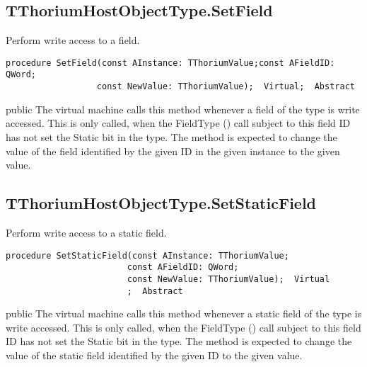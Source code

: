 \subsection{TThoriumHostObjectType.SetField}
\label{thoriumcorepkg:thorium:tthoriumhostobjecttype:setfield}
\begin{FPCList}
\Synopsis
Perform write access to a field.\Declaration 

\begin{verbatim}
procedure SetField(const AInstance: TThoriumValue;const AFieldID: QWord;
                  const NewValue: TThoriumValue);  Virtual;  Abstract
\end{verbatim}
\Visibility
public
\Description
The virtual machine calls this method whenever a field of the type is write accessed. This is only called, when the FieldType (\pageref{thoriumcorepkg:thorium:tthoriumhostobjecttype:fieldtype}) call subject to this field ID has not set the Static bit in the type. The method is expected to change the value of the field identified by the given ID in the given instance to the given value.\end{FPCList}
\subsection{TThoriumHostObjectType.SetStaticField}
\label{thoriumcorepkg:thorium:tthoriumhostobjecttype:setstaticfield}
\begin{FPCList}
\Synopsis
Perform write access to a static field.\Declaration 

\begin{verbatim}
procedure SetStaticField(const AInstance: TThoriumValue;
                        const AFieldID: QWord;
                        const NewValue: TThoriumValue);  Virtual
                        ;  Abstract
\end{verbatim}
\Visibility
public
\Description
The virtual machine calls this method whenever a static field of the type is write accessed. This is only called, when the FieldType (\pageref{thoriumcorepkg:thorium:tthoriumhostobjecttype:fieldtype}) call subject to this field ID has not set the Static bit in the type. The method is expected to change the value of the static field identified by the given ID to the given value.\end{FPCList}
